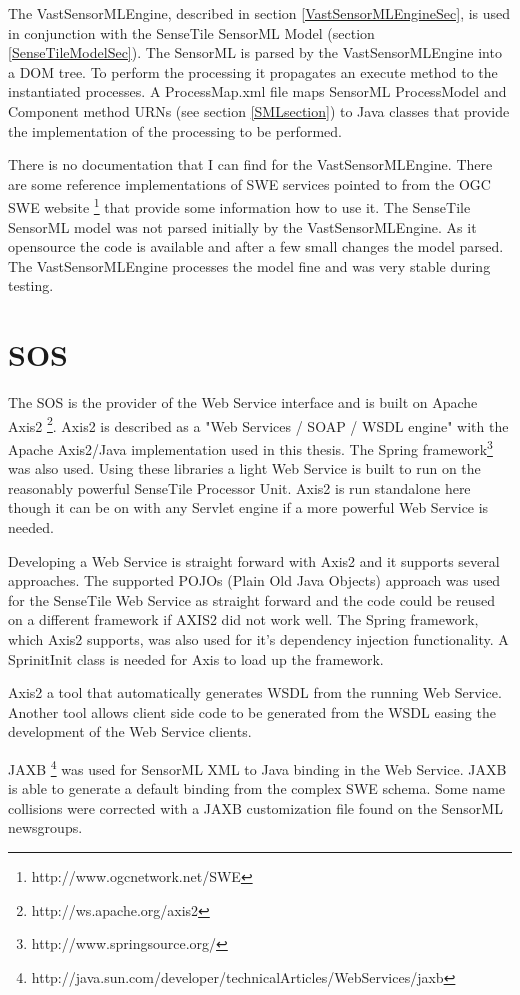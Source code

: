 \documentclass[]{final_report}
\begin{document}
The VastSensorMLEngine, described in section \ref{VastSensorMLEngineSec}, is used in conjunction with the SenseTile SensorML Model (section \ref{SenseTileModelSec}). The SensorML is parsed by the VastSensorMLEngine into a DOM tree. To perform the processing it propagates an execute method to the instantiated processes. A ProcessMap.xml file maps SensorML ProcessModel and Component method  URNs  (see section \ref{SMLsection}) to Java classes that provide the implementation of the processing to be performed. 

There is no documentation that I can find for the VastSensorMLEngine. There are some reference implementations of SWE services pointed to from the OGC SWE website \footnote{http://www.ogcnetwork.net/SWE} that provide some information how to use it. The SenseTile SensorML model was not parsed initially by the VastSensorMLEngine. As it opensource the code is available and after a few small changes the model parsed. The VastSensorMLEngine processes the model fine and was very stable during testing.


\section{SOS}
The SOS is the provider of the Web Service interface and is built on Apache Axis2 \footnote{http://ws.apache.org/axis2}. 
Axis2 is described as a "Web Services / SOAP / WSDL engine"  with the Apache Axis2/Java implementation used in this thesis. The Spring framework\footnote{http://www.springsource.org/} was also used. Using these libraries a light Web Service is built to run on the reasonably powerful SenseTile Processor Unit. Axis2 is run standalone here though it can be on with any Servlet engine if a more powerful Web Service is needed.

Developing a Web Service is straight forward with Axis2 and it supports several approaches. The supported POJOs (Plain Old Java Objects) approach was used for the SenseTile Web Service as straight forward and the code could be reused on a different framework if AXIS2 did not work well. The Spring framework, which Axis2 supports, was also used for it's dependency injection functionality. A SprinitInit class is needed for Axis to load up the framework.

Axis2 a tool that automatically generates WSDL from the running Web Service. Another tool allows client side code to be generated from the WSDL easing the development of the Web Service clients.

JAXB \footnote{http://java.sun.com/developer/technicalArticles/WebServices/jaxb} was used for SensorML XML to Java binding in the Web Service. JAXB is able to generate a default binding from the complex SWE schema. Some name collisions were corrected with a JAXB customization file found on the SensorML newsgroups.
\end{document}
